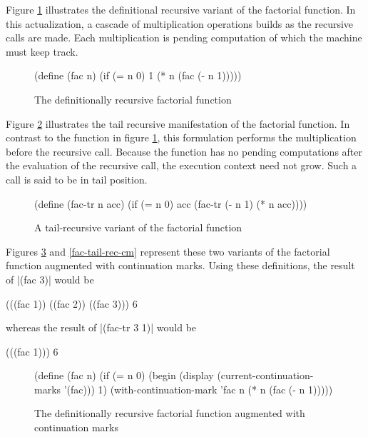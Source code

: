 \documentclass[ms,electronic,twosidetoc,letterpaper,chaptercenter,parttop]{byumsphd}
\begin{document}
Figure \ref{fac-rec} illustrates the definitional recursive variant of the factorial
function. In this actualization, a cascade of multiplication operations builds as the
recursive calls are made. Each multiplication is pending computation of which the machine 
must keep track.

\begin{figure}
\begin{schemedisplay}
(define (fac n)
  (if (= n 0)
      1
      (* n (fac (- n 1)))))
\end{schemedisplay}
\caption{The definitionally recursive factorial function}
\label{fac-rec}
\end{figure}

Figure \ref{fac-tail-rec} illustrates the tail recursive manifestation of the factorial
function. In contrast to the function in figure \ref{fac-rec}, this formulation performs
the multiplication before the recursive call. Because the function has no pending
computations after the evaluation of the recursive call, the execution context need not
grow. Such a call is said to be in tail position.

\begin{figure}
\begin{schemedisplay}
(define (fac-tr n acc)
  (if (= n 0)
      acc
      (fac-tr (- n 1) (* n acc))))
\end{schemedisplay}
\caption{A tail-recursive variant of the factorial function}
\label{fac-tail-rec}
\end{figure}

Figures \ref{fac-rec-cm} and \ref{fac-tail-rec-cm} represent these two variants of the
factorial function augmented with continuation marks. Using these definitions, the 
result of \scheme|(fac 3)| would be

\begin{schemedisplay}
(((fac 1)) ((fac 2)) ((fac 3)))
6
\end{schemedisplay}

whereas the result of \scheme|(fac-tr 3 1)| would be

\begin{schemedisplay}
(((fac 1)))
6
\end{schemedisplay}

\begin{figure}
\begin{schemedisplay}
(define (fac n)
  (if (= n 0)
      (begin
        (display (current-continuation-marks '(fac)))
        1)
      (with-continuation-mark 'fac n (* n (fac (- n 1)))))
\end{schemedisplay}
\caption{The definitionally recursive factorial function augmented with continuation marks}
\label{fac-rec-cm}
\end{figure}
\end{document}
